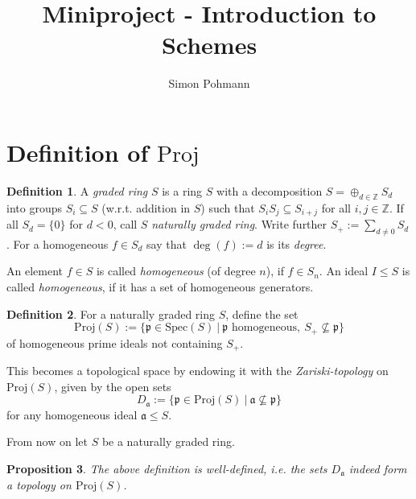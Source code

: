 \documentclass{scrartcl}
\title{Miniproject - Introduction to Schemes}
\author{Simon Pohmann}
\newcommand{\Z}{\mathbb{Z}}
\newcommand{\p}{\mathfrak{p}}
\renewcommand{\a}{\mathfrak{a}}
\newcommand{\Spec}{\mathrm{Spec}}
\newcommand{\Proj}{\mathrm{Proj}}
\newtheorem{prop}{Proposition}
\theoremstyle{definition}
\newtheorem{definition}[prop]{Definition}
\begin{document}
\maketitle

\section{Definition of $\Proj$}

\begin{definition}
    A \emph{graded ring} $S$ is a ring $S$ with a decomposition $S = \oplus_{d \in \Z} S_d$ into groups $S_i \subseteq S$ (w.r.t. addition in $S$) such that $S_i S_j \subseteq S_{i + j}$ for all $i, j \in \Z$.
    If all $S_d = \{ 0 \}$ for $d < 0$, call $S$ \emph{naturally graded ring}.
    Write further $S_+ := \sum_{d \neq 0} S_d$.
    For a homogeneous $f \in S_d$ say that $\deg(f) := d$ is its \emph{degree}.

    An element $f \in S$ is called \emph{homogeneous} (of degree $n$), if $f \in S_n$.
    An ideal $I \leq S$ is called \emph{homogeneous}, if it has a set of homogeneous generators.
\end{definition}
\begin{definition}
    For a naturally graded ring $S$, define the set
    \begin{equation*}
        \Proj(S) := \{ \p \in \Spec(S) \ | \ \text{$\p$ homogeneous}, \ S_+ \not\subseteq \p \}
    \end{equation*}
    of homogeneous prime ideals not containing $S_+$.

    This becomes a topological space by endowing it with the \emph{Zariski-topology} on $\Proj(S)$, given by the open sets
    \begin{equation*}
        D_{\a} := \{ \p \in \Proj(S) \ | \ \a \not\subseteq \p \}
    \end{equation*}
    for any homogeneous ideal $\a \leq S$.
\end{definition}
From now on let $S$ be a naturally graded ring.
\begin{prop}
    The above definition is well-defined, i.e. the sets $D_\a$ indeed form a topology on $\Proj(S)$.
\end{prop}
\end{document}
